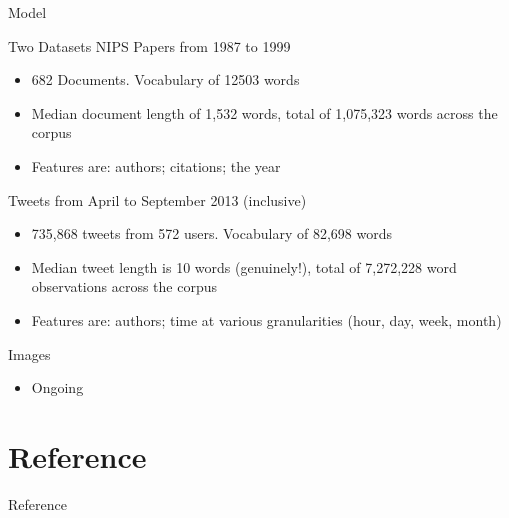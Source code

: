 \documentclass[xcolor=dvipsnames]{beamer}
\begin{document}

\begin{frame}{Model}

Two Datasets
NIPS Papers from 1987 to 1999
\begin{itemize}
    \item 682 Documents. Vocabulary of 12503 words
    \item Median document length of 1,532 words, total of 1,075,323 words across the corpus
    \item Features are: authors; citations; {\color{gray} the year}
\end{itemize}

Tweets from April to September 2013 (inclusive)
\begin{itemize}
    \item 735,868 tweets from 572 users. Vocabulary of 82,698 words
    \item Median tweet length is 10 words (genuinely!), total of 7,272,228 word observations across the corpus 
    \item Features are: authors; time at various granularities (hour, day, week, month)
\end{itemize}

Images
\begin{itemize}
    \item Ongoing
\end{itemize}

\end{frame}





\section{Reference}
\begin{frame}[allowframebreaks]{Reference}






\end{frame}
\end{document}
